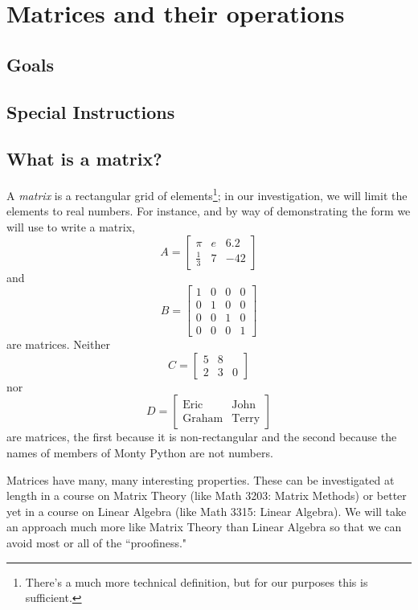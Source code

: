 \documentclass[m3380-lec-main.tex]{subfiles}
\begin{document}
\chapter{Matrices and their operations}

\section*{Goals}

\section*{Special Instructions}

\section{What is a matrix?}
A \emph{matrix} is a rectangular grid of elements\footnote{There's a much more technical definition, but for our purposes this is sufficient.}; in our investigation, we will limit the elements to real numbers. For instance, and by way of demonstrating the form we will use to write a matrix, 
\[A=\begin{bmatrix} \pi& e& 6.2 \\ \frac13 & 7 & -42\end{bmatrix}\]
and
\[B = \begin{bmatrix} 1 & 0 & 0 & 0 \\ 0 & 1 & 0 & 0 \\ 0 & 0 & 1 & 0 \\ 0 & 0 & 0 & 1 \end{bmatrix}\]
are matrices. Neither
\[ C = \begin{bmatrix} 5 & 8 & \\ 2 & 3 & 0 \end{bmatrix}\] nor
\[ D = \begin{bmatrix} \text{Eric} & \text{John} \\ \text{Graham} & \text{Terry} \end{bmatrix}\]
are matrices, the first because it is non-rectangular and the second because the names of members of Monty Python are not numbers.

Matrices have many, many interesting properties. These can be investigated at length in a course on Matrix Theory (like Math 3203: Matrix Methods) or better yet in a course on Linear Algebra (like Math 3315: Linear Algebra). We will take an approach much more like Matrix Theory than Linear Algebra so that we can avoid most or all of the ``proofiness."
\end{document}
